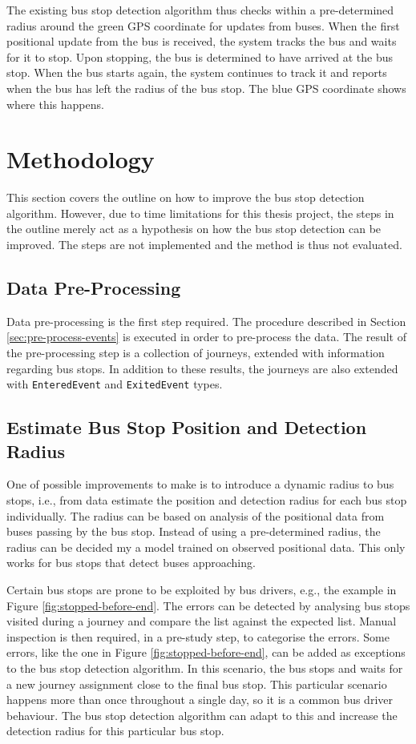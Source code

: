 The existing bus stop detection algorithm thus checks within a pre-determined radius around the green GPS coordinate for updates from buses.
When the first positional update from the bus is received, the system tracks the bus and waits for it to stop.
Upon stopping, the bus is determined to have arrived at the bus stop.
When the bus starts again, the system continues to track it and reports when the bus has left the radius of the bus stop.
The blue GPS coordinate shows where this happens.

\section{Methodology}
This section covers the outline on how to improve the bus stop detection algorithm.
However, due to time limitations for this thesis project, the steps in the outline merely act as a hypothesis on how the bus stop detection can be improved.
The steps are not implemented and the method is thus not evaluated.

\subsection{Data Pre-Processing}
Data pre-processing is the first step required.
The procedure described in Section \ref{sec:pre-process-events} is executed in order to pre-process the data.
The result of the pre-processing step is a collection of journeys, extended with information regarding bus stops.
In addition to these results, the journeys are also extended with \texttt{EnteredEvent} and \texttt{ExitedEvent} types.

\subsection{Estimate Bus Stop Position and Detection Radius}
One of possible improvements to make is to introduce a dynamic radius to bus stops, i.e., from data estimate the position and detection radius for each bus stop individually.
The radius can be based on analysis of the positional data from buses passing by the bus stop.
Instead of using a pre-determined radius, the radius can be decided my a model trained on observed positional data.
This only works for bus stops that detect buses approaching.

Certain bus stops are prone to be exploited by bus drivers, e.g., the example in Figure \ref{fig:stopped-before-end}.
The errors can be detected by analysing bus stops visited during a journey and compare the list against the expected list.
Manual inspection is then required, in a pre-study step, to categorise the errors.
Some errors, like the one in Figure \ref{fig:stopped-before-end}, can be added as exceptions to the bus stop detection algorithm.
In this scenario, the bus stops and waits for a new journey assignment close to the final bus stop.
This particular scenario happens more than once throughout a single day, so it is a common bus driver behaviour.
The bus stop detection algorithm can adapt to this and increase the detection radius for this particular bus stop.

